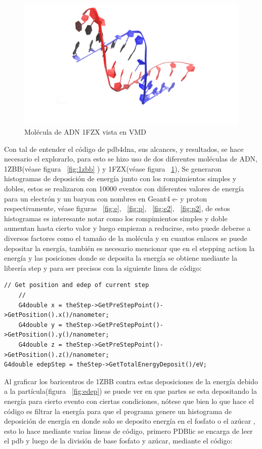 \begin{figure}[htbp]
    \centering
    \includegraphics[width=0.8\linewidth]{./Figures/1FZX.png}
    \caption[Molécula de ADN 1FZX]{Molécula de ADN 1FZX vista en VMD}
    \label{fig:1fzx}
\end{figure}
Con tal de entender el código de pdb4dna, sus alcances, y resultados, se hace necesario el explorarlo, para esto se hizo uso de dos diferentes moléculas de ADN, 1ZBB(véase figura ~\ref{fig:1zbb} ) y 1FZX(véase figura ~\ref{fig:1fzx}), Se generaron histogramas de deposición de energía junto con los rompimientos simples y dobles, estos se realizaron con 10000 eventos con diferentes valores de energía para un electrón y un baryon con nombres en Geant4 e- y proton respectivamente, véase figuras ~\ref{fig:e}, ~\ref{fig:p}, ~\ref{fig:e2}, ~\ref{fig:p2}, de estos histogramas es interesante notar como los rompimientos simples y doble aumentan hasta cierto valor y luego empiezan a reducirse, esto puede deberse a diversos factores como el tamaño de la molécula y en cuantos enlaces se puede depositar la energía, también es necesario mencionar que en el stepping action la energía y las posiciones donde se deposita la energía se obtiene mediante la librería step y para ser precisos con la siguiente linea de código:
\lstset {language=C++}
\begin{lstlisting}
// Get position and edep of current step
    //
    G4double x = theStep->GetPreStepPoint()->GetPosition().x()/nanometer;
    G4double y = theStep->GetPreStepPoint()->GetPosition().y()/nanometer;
    G4double z = theStep->GetPreStepPoint()->GetPosition().z()/nanometer;
G4double edepStep = theStep->GetTotalEnergyDeposit()/eV;
\end{lstlisting}

Al graficar los baricentros de 1ZBB contra estas deposiciones de la energía debido a la partícula(figura ~\ref{fig:edep}) se puede ver en que partes se esta depositando la energía para cierto evento con ciertas condiciones, nótese que  bien lo que hace el código es filtrar la energía para que el programa genere un histograma de deposición de energía en donde solo se deposito energía en el fosfato o el azúcar , esto lo hace mediante varias lineas de código, primero PDBlic se encarga de leer el pdb y luego de la división de base fosfato y azúcar, mediante el código:

